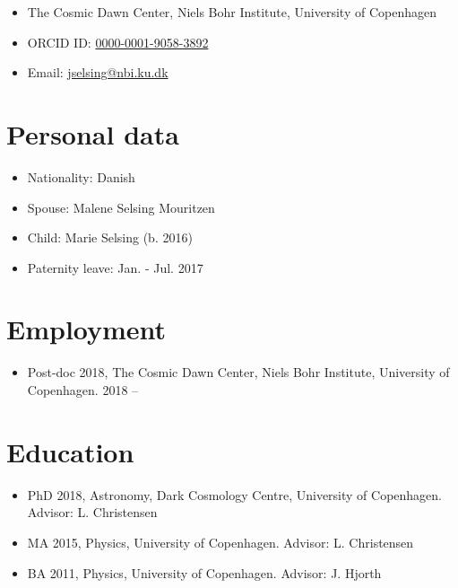 \documentclass[12pt,letterpaper]{article}
\begin{document}
\thispagestyle{empty}\sloppy\sloppypar

{\huge \name}
\vspace{-0.25em}

\begin{itemize}
  \item The Cosmic Dawn Center, Niels Bohr Institute, University of Copenhagen
  \item  ORCID ID: \href{https://orcid.org/0000-0001-9058-3892}{0000-0001-9058-3892}
  \item Email: \href{mailto:jselsing@nbi.ku.dk}{jselsing@nbi.ku.dk} 
\end{itemize}


\section*{Personal data}

\begin{itemize}
	\item Nationality: Danish
	\item Spouse: Malene Selsing Mouritzen
	\item Child: Marie Selsing (b. 2016) 
	\item Paternity leave: Jan. - Jul. 2017
	
\end{itemize}


\section*{Employment}
\begin{itemize}
	\item Post-doc 2018, The Cosmic Dawn Center, Niels Bohr Institute, University of Copenhagen.  2018 --
\end{itemize}


\section*{Education}
	\begin{itemize}
	\item PhD 2018, Astronomy, Dark Cosmology Centre, University of Copenhagen.
		{Advisor: L. Christensen}
	\item MA 2015, Physics, University of Copenhagen.
		{Advisor: L. Christensen}
	\item BA 2011, Physics, University of Copenhagen.
		{Advisor: J. Hjorth}
	\end{itemize}
\end{document}

